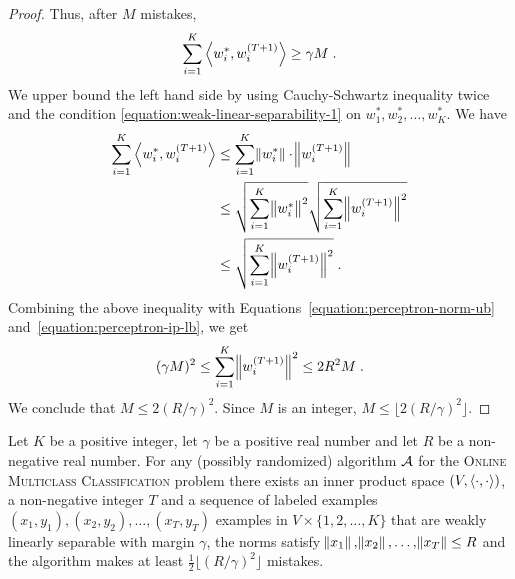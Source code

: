 \begin{proof}
\endgroup
Thus, after $M$ mistakes,
\[
\label{equation:perceptron-ip-lb}
\sum_{i=1}^K \left\langle w_i^*, w_i^{(T+1)} \right\rangle \ge \gamma M \; .
\]
We upper bound the left hand side by using Cauchy-Schwartz inequality twice and
the condition \eqref{equation:weak-linear-separability-1} on $w_1^*, w_2^*, \dots,
w_K^*$. We have
\begin{align*}
\sum_{i=1}^K \left\langle w_i^*, w_i^{(T+1)} \right\rangle
& \le \sum_{i=1}^K \norm{w_i^*} \cdot \norm{w_i^{(T+1)}} \\
& \le \sqrt{\sum_{i=1}^K \norm{w_i^*}^2} \sqrt{\sum_{i=1}^K \norm{w_i^{(T+1)}}^2} \\
& \le \sqrt{\sum_{i=1}^K \norm{w_i^{(T+1)}}^2} \; .
\end{align*}
Combining the above inequality with Equations~\eqref{equation:perceptron-norm-ub}
and~\eqref{equation:perceptron-ip-lb}, we get
$$
(\gamma M)^2 \le \sum_{i=1}^K \norm{w_i^{(T+1)}}^2 \le 2R^2 M \; .
$$
We conclude that $M \le 2(R/\gamma)^2$. Since $M$ is an integer, $M \le \lfloor 2(R/\gamma)^2 \rfloor$.
\end{proof}


\begin{theorem}
\label{theorem:online-multiclass-classification-mistake-lower-bound}
Let $K$ be a positive integer, let $\gamma$ be a positive real number and let
$R$ be a non-negative real number. For any (possibly randomized) algorithm
$\mathcal{A}$ for the \textsc{Online Multiclass Classification} problem there exists
an inner product space $(V, \left\langle \cdot, \cdot \right\rangle)$, a non-negative integer $T$ and
a sequence of labeled examples $(x_1, y_1), (x_2, y_2), \dots, (x_T, y_T)$
examples in $V \times \{1,2,\dots,K\}$ that are weakly linearly separable with
margin $\gamma$, the norms satisfy $\norm{x_1}, \norm{x_2}, \dots, \norm{x_T}
\le R$ and the algorithm makes at least $\frac 1 2 \lfloor (R/\gamma)^2 \rfloor$
mistakes.
\end{theorem}

